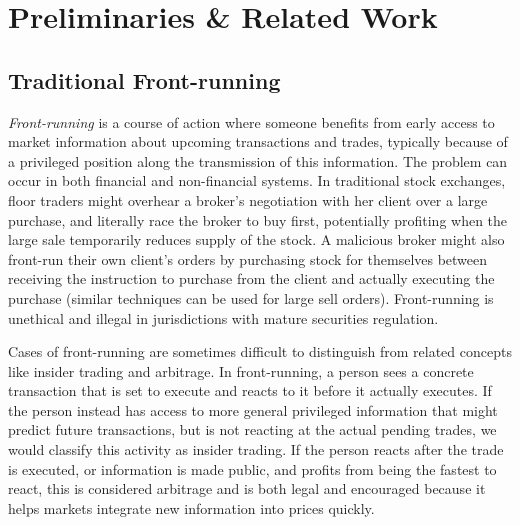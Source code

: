 
\section{Preliminaries \& Related Work}

\subsection{Traditional Front-running} 
\label{sec:What is front-running?}

\emph{Front-running} is a course of action where someone benefits from early access to market information about upcoming transactions and trades, typically because of a privileged position along the transmission of this information. The problem can occur in both financial and non-financial systems. In traditional stock exchanges, floor traders might overhear a broker's negotiation with her client over a large purchase, and literally race the broker to buy first, potentially profiting when the large sale temporarily reduces supply of the stock. A malicious broker might also front-run their own client's orders by purchasing stock for themselves between receiving the instruction to purchase from the client and actually executing the purchase (similar techniques can be used for large sell orders). Front-running is unethical and illegal in jurisdictions with mature securities regulation. 

Cases of front-running are sometimes difficult to distinguish from related concepts like insider trading and arbitrage. In front-running, a person sees a concrete transaction that is set to execute and reacts to it before it actually executes. If the person instead has access to more general privileged information that might predict future transactions, but is not reacting at the actual pending trades, we would classify this activity as insider trading. If the person reacts after the trade is executed, or information is made public, and profits from being the fastest to react, this is considered arbitrage and is both legal and encouraged because it helps markets integrate new information into prices quickly.

